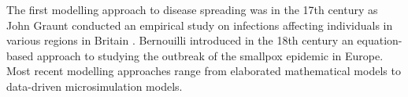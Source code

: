 \documentclass[smallextended]{svjour3}       %
\begin{document}
The first modelling approach to disease spreading was in the 17th century as John Graunt  conducted an empirical study on infections affecting individuals in various regions in Britain \cite{morabia2013epidemiology}. Bernouilli introduced in the 18th century an equation-based approach to studying the outbreak of the smallpox epidemic in Europe\cite{dietz2002daniel}.
Most recent modelling approaches range from elaborated mathematical models to data-driven microsimulation models.
\end{document}
